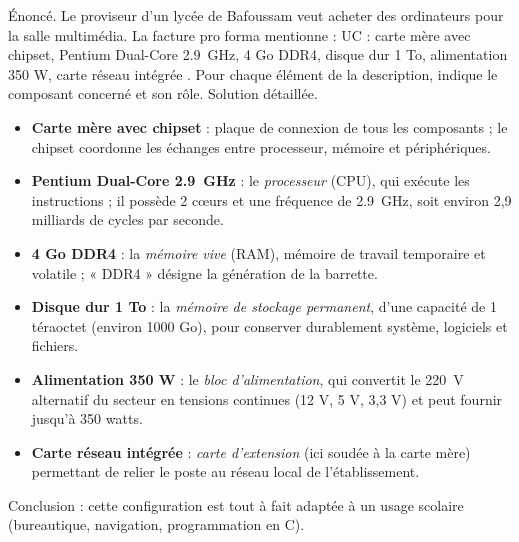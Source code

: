 \documentclass[11pt]{article}
\begin{document}
\begin{exoresolu}
Énoncé. Le proviseur d'un lycée de Bafoussam veut acheter des ordinateurs pour la salle multimédia. La facture pro forma mentionne : \og UC : carte mère avec chipset, Pentium Dual-Core \SI{2,9}{GHz}, 4 Go DDR4, disque dur 1 To, alimentation 350 W, carte réseau intégrée \fg{}. Pour chaque élément de la description, indique le composant concerné et son rôle.
\tcblower
Solution détaillée.
\begin{itemize}
\item \textbf{Carte mère avec chipset} : plaque de connexion de tous les composants ; le chipset coordonne les échanges entre processeur, mémoire et périphériques.
\item \textbf{Pentium Dual-Core \SI{2,9}{GHz}} : le \emph{processeur} (CPU), qui exécute les instructions ; il possède 2 cœurs et une fréquence de \SI{2,9}{GHz}, soit environ 2,9 milliards de cycles par seconde.
\item \textbf{4 Go DDR4} : la \emph{mémoire vive} (RAM), mémoire de travail temporaire et volatile ; « DDR4 » désigne la génération de la barrette.
\item \textbf{Disque dur 1 To} : la \emph{mémoire de stockage permanent}, d'une capacité de 1 téraoctet (environ \num{1000} Go), pour conserver durablement système, logiciels et fichiers.
\item \textbf{Alimentation 350 W} : le \emph{bloc d'alimentation}, qui convertit le \SI{220}{V} alternatif du secteur en tensions continues (12 V, 5 V, 3,3 V) et peut fournir jusqu'à \num{350} watts.
\item \textbf{Carte réseau intégrée} : \emph{carte d'extension} (ici soudée à la carte mère) permettant de relier le poste au réseau local de l'établissement.
\end{itemize}
Conclusion : cette configuration est tout à fait adaptée à un usage scolaire (bureautique, navigation, programmation en C).
\end{exoresolu}
\end{document}
